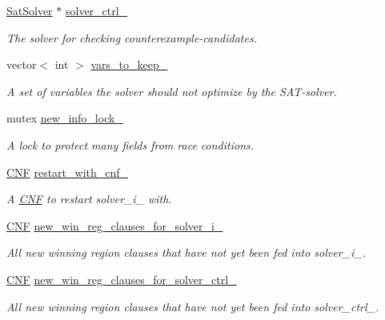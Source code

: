 \begin{DoxyCompactItemize}
\hyperlink{classSatSolver}{Sat\-Solver} $\ast$ \hyperlink{classClauseExplorerSAT_a7884d171120e8397140e30fdc28767eb}{solver\-\_\-ctrl\-\_\-}
\begin{DoxyCompactList}\small\item\em The solver for checking counterexample-\/candidates. \end{DoxyCompactList}\item 
vector$<$ int $>$ \hyperlink{classClauseExplorerSAT_a9d9c6caf1a451ed22a096c2ef5e8bbc2}{vars\-\_\-to\-\_\-keep\-\_\-}
\begin{DoxyCompactList}\small\item\em A set of variables the solver should not optimize by the S\-A\-T-\/solver. \end{DoxyCompactList}\item 
mutex \hyperlink{classClauseExplorerSAT_a674651f8fbf9ed93264ce3369bd5332b}{new\-\_\-info\-\_\-lock\-\_\-}
\begin{DoxyCompactList}\small\item\em A lock to protect many fields from race conditions. \end{DoxyCompactList}\item 
\hyperlink{classCNF}{C\-N\-F} \hyperlink{classClauseExplorerSAT_a1a9dc7f76967c8164e9625df34dec172}{restart\-\_\-with\-\_\-cnf\-\_\-}
\begin{DoxyCompactList}\small\item\em A \hyperlink{classCNF}{C\-N\-F} to restart solver\-\_\-i\-\_\- with. \end{DoxyCompactList}\item 
\hyperlink{classCNF}{C\-N\-F} \hyperlink{classClauseExplorerSAT_a2c3e73b4c0529b9139354a965d34e81f}{new\-\_\-win\-\_\-reg\-\_\-clauses\-\_\-for\-\_\-solver\-\_\-i\-\_\-}
\begin{DoxyCompactList}\small\item\em All new winning region clauses that have not yet been fed into solver\-\_\-i\-\_\-. \end{DoxyCompactList}\item 
\hyperlink{classCNF}{C\-N\-F} \hyperlink{classClauseExplorerSAT_a7d923928f3cb6209b29f5cc5104b5fe2}{new\-\_\-win\-\_\-reg\-\_\-clauses\-\_\-for\-\_\-solver\-\_\-ctrl\-\_\-}
\begin{DoxyCompactList}\small\item\em All new winning region clauses that have not yet been fed into solver\-\_\-ctrl\-\_\-. \end{DoxyCompactList}\item 

\end{DoxyCompactItemize}
